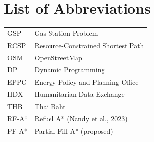 \documentclass[12pt, a4paper, oneside]{report}
\theoremstyle{definition}
\theoremstyle{remark}
\begin{document}
\chapter*{List of Abbreviations}
\begin{tabular}{ll}
GSP    & Gas Station Problem \\
RCSP   & Resource-Constrained Shortest Path \\
OSM    & OpenStreetMap \\
DP     & Dynamic Programming \\
EPPO   & Energy Policy and Planning Office \\
HDX    & Humanitarian Data Exchange \\
THB    & Thai Baht \\
RF-A*  & Refuel A* (Nandy et al., 2023) \\
PF-A*  & Partial-Fill A* (proposed) \\
\end{tabular}



\clearpage
{}
\setcounter{page}{1}










\nocite{*}
\printbibliography[heading=bibintoc, title={References}]
\end{document}
